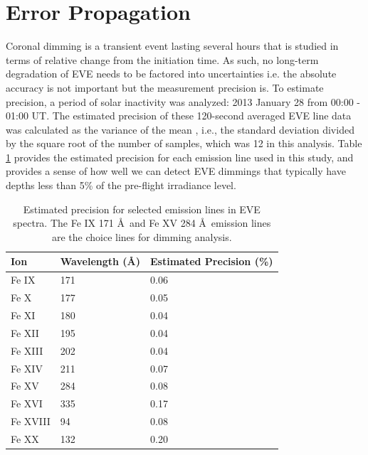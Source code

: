 \section{Error Propagation}
\label{sec:deconvolveerrors}
Coronal dimming is a transient event lasting several hours that is studied in terms of relative change from the initiation time. As such, no long-term degradation of EVE needs to be factored into uncertainties i.e. the absolute accuracy is not important but the measurement precision is. To estimate precision, a period of solar inactivity was analyzed: 2013 January 28 from 00:00 - 01:00 UT. The estimated precision of these 120-second averaged EVE line data was calculated as the variance of the mean \citep{Bevington2003}, i.e., the standard deviation divided by the square root of the number of samples, which was 12 in this analysis. Table \ref{tab:evelineprecision} provides the estimated precision for each emission line used in this study, and provides a sense of how well we can detect EVE dimmings that typically have depths less than 5\% of the pre-flight irradiance level.

\begin{table}[!h]
    \caption[EVE precision by emission line]{
    Estimated precision for selected emission lines in EVE spectra. The Fe IX 171 \AA\ and Fe XV 284 \AA\ emission lines
    are the choice lines for dimming analysis.  
    }
    \begin{center}
    \begin{tabular}{|l|l|l|} \hline
	Ion & Wavelength (\AA) & Estimated Precision (\%) \\ \hline \hline
	Fe IX & 171 & 0.06 \\ \hline
	Fe X & 177 & 0.05  \\ \hline
	Fe XI & 180 & 0.04 \\ \hline
	Fe XII & 195 & 0.04 \\ \hline
	Fe XIII & 202 & 0.04 \\ \hline
	Fe XIV & 211 & 0.07 \\ \hline
	Fe XV & 284 & 0.08 \\ \hline
	Fe XVI & 335 & 0.17 \\ \hline
	Fe XVIII & 94 & 0.08 \\ \hline
	Fe XX & 132 & 0.20 \\ \hline
	\end{tabular}
    \\ \rule{0mm}{5mm}
    \end{center}
    \label{tab:evelineprecision}
\end{table}

